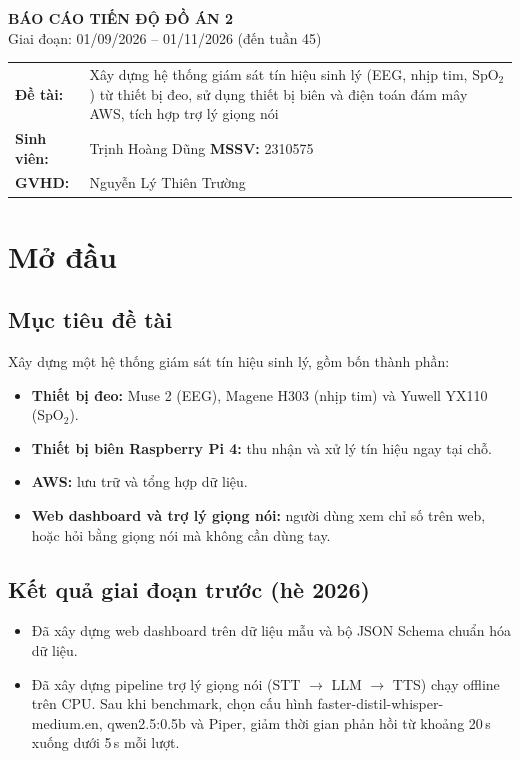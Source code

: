 \documentclass[12pt,a4paper]{article}
\newcommand{\spo}{SpO$_2$}
\begin{document}
\begin{center}
  {\Large\bfseries BÁO CÁO TIẾN ĐỘ ĐỒ ÁN 2}\\[1ex]
  Giai đoạn: 01/09/2026 -- 01/11/2026 (đến tuần 45)
\end{center}

\noindent
\begin{tabularx}{\textwidth}{@{}lL@{}}
  \textbf{Đề tài:} & Xây dựng hệ thống giám sát tín hiệu sinh lý (EEG, nhịp tim, \spo) từ thiết bị đeo, sử dụng thiết bị biên và điện toán đám mây AWS, tích hợp trợ lý giọng nói \\
  \textbf{Sinh viên:} & Trịnh Hoàng Dũng \quad \textbf{MSSV:} 2310575 \\
  \textbf{GVHD:} & Nguyễn Lý Thiên Trường \\
\end{tabularx}

\section{Mở đầu}

\subsection{Mục tiêu đề tài}

Xây dựng một hệ thống giám sát tín hiệu sinh lý, gồm bốn thành phần:
\begin{itemize}
  \item \textbf{Thiết bị đeo:} Muse 2 (EEG), Magene H303 (nhịp tim) và Yuwell YX110 (\spo).
  \item \textbf{Thiết bị biên Raspberry Pi 4:} thu nhận và xử lý tín hiệu ngay tại chỗ.
  \item \textbf{AWS:} lưu trữ và tổng hợp dữ liệu.
  \item \textbf{Web dashboard và trợ lý giọng nói:} người dùng xem chỉ số trên web, hoặc hỏi bằng giọng nói mà không cần dùng tay.
\end{itemize}

\subsection{Kết quả giai đoạn trước (hè 2026)}

\begin{itemize}
  \item Đã xây dựng web dashboard trên dữ liệu mẫu và bộ JSON Schema chuẩn hóa dữ liệu.
  \item Đã xây dựng pipeline trợ lý giọng nói (STT $\rightarrow$ LLM $\rightarrow$ TTS) chạy offline trên CPU. Sau khi benchmark, chọn cấu hình faster-distil-whisper-medium.en, qwen2.5:0.5b và Piper, giảm thời gian phản hồi từ khoảng 20\,s xuống dưới 5\,s mỗi lượt.
\end{itemize}
\end{document}
